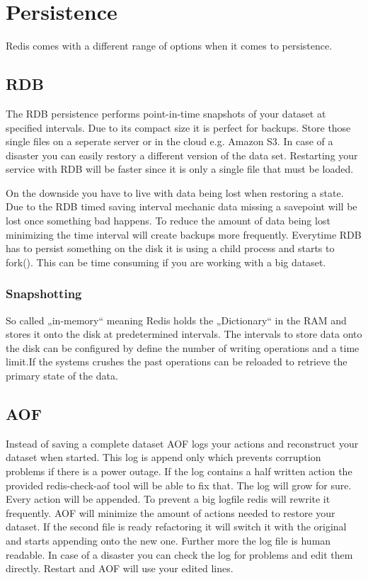 \chapter{Persistence}
Redis comes with a different range of options when it comes to persistence. 

\section{RDB}
The RDB persistence performs point-in-time snapshots of your dataset at specified intervals.
Due to its compact size it is perfect for backups. Store those single files on a seperate server or in the cloud e.g. Amazon S3.
In case of a disaster you can easily restory a different version of the data set.
Restarting your service with RDB will be faster since it is only a single file that must be loaded.

On the downside you have to live with data being lost when restoring a state. Due to the RDB timed saving interval mechanic data missing a savepoint will be lost once something bad happens.
To reduce the amount of data being lost minimizing the time interval will create backups more frequently.
Everytime RDB has to persist something on the disk it is using a child process and starts to fork(). This can be time consuming if you are working with a big dataset.

\subsection{Snapshotting}
So called „in-memory“ meaning Redis holds the „Dictionary“ in the RAM and stores it onto the disk at predetermined intervals. The intervals to store data onto the disk can be configured by define the number of writing operations and a time limit.If the systems crushes the past operations can be reloaded to retrieve the primary state of the data.

\section{AOF}
Instead of saving a complete dataset AOF logs your actions and reconstruct your dataset when started.
This log is append only which prevents corruption problems if there is a power outage. If the log contains a half written action the provided redis-check-aof tool will be able to fix that.
The log will grow for sure. Every action will be appended. To prevent a big logfile redis will rewrite it frequently. AOF will minimize the amount of actions needed to restore your dataset. If the second file is ready refactoring it will switch it with the original and starts appending onto the new one.
Further more the log file is human readable. In case of a disaster you can check the log for problems and edit them directly. Restart and AOF will use your edited lines.

